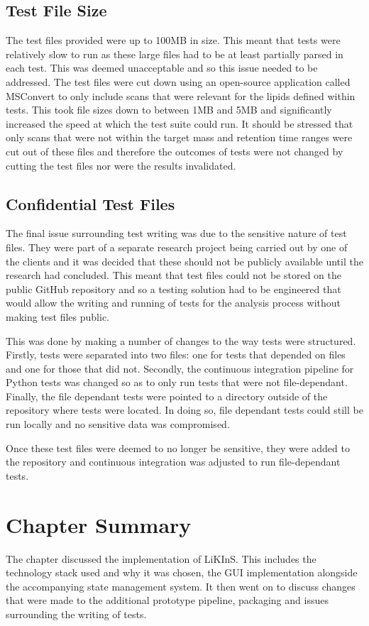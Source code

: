 \documentclass{l4proj}
\begin{document}
\subsection{Test File Size}
The test files provided were up to 100MB in size. This meant that tests were relatively slow to run as these large files had to be at least partially parsed in each test. This was deemed unacceptable and so this issue needed to be addressed. The test files were cut down using an open-source application called MSConvert to only include scans that were relevant for the lipids defined within tests. This took file sizes down to between 1MB and 5MB and significantly increased the speed at which the test suite could run. It should be stressed that only scans that were not within the target mass and retention time ranges were cut out of these files and therefore the outcomes of tests were not changed by cutting the test files nor were the results invalidated. 

\subsection{Confidential Test Files}
The final issue surrounding test writing was due to the sensitive nature of test files. They were part of a separate research project being carried out by one of the clients and it was decided that these should not be publicly available until the research had concluded. This meant that test files could not be stored on the public GitHub repository and so a testing solution had to be engineered that would allow the writing and running of tests for the analysis process without making test files public.

This was done by making a number of changes to the way tests were structured. Firstly, tests were separated into two files: one for tests that depended on files and one for those that did not. Secondly, the continuous integration pipeline for Python tests was changed so as to only run tests that were not file-dependant. Finally, the file dependant tests were pointed to a directory outside of the repository where tests were located. In doing so, file dependant tests could still be run locally and no sensitive data was compromised.

Once these test files were deemed to no longer be sensitive, they were added to the repository and continuous integration was adjusted to run file-dependant tests.

\section{Chapter Summary}
The chapter discussed the implementation of LiKInS. This includes the technology stack used and why it was chosen, the GUI implementation alongside the accompanying state management system. It then went on to discuss changes that were made to the additional prototype pipeline, packaging and issues surrounding the writing of tests.
\end{document}
